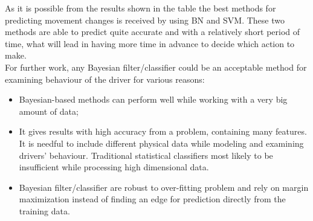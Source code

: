 \begin{table}[h]
	\caption{Different Methods Performance Comparison} 
	\centering 
		\label{table:DA}
	\end{table}


As it is possible from the results shown in the table the best methods for predicting movement changes is received by using \gls{BN} and \gls{SVM}. These two methods are able to predict quite accurate and with a relatively short period of time, what will lead in having more time in advance to decide which action to make. \\

For further work, any Bayesian filter/classifier could be an acceptable method for examining behaviour of the driver for various reasons: 

\begin{itemize}
	\item Bayesian-based methods can perform well while working with a very big amount of data;
	\item It gives results with high accuracy from a problem, containing many features. It is needful to include different physical data while modeling and examining drivers’ behaviour. Traditional statistical classifiers most likely to be insufficient while processing high dimensional data.
	\item Bayesian filter/classifier are robust to over-fitting problem and rely on margin maximization instead of finding an edge for prediction directly from the training data.
\end{itemize}

